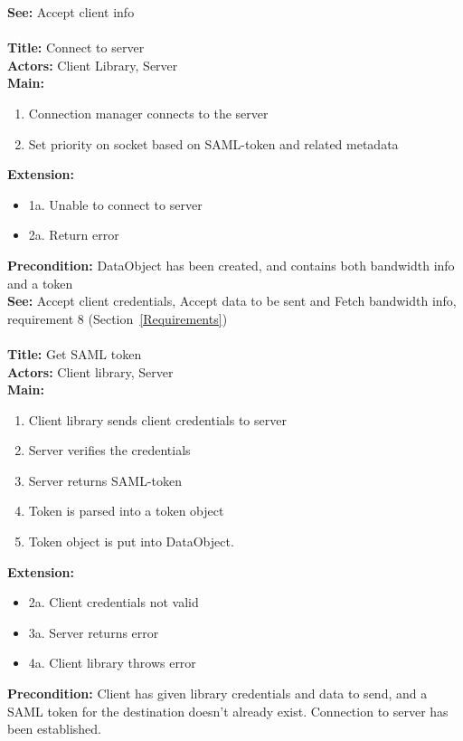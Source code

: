 		\textbf{See:} Accept client info
		\\\\
		\textbf{Title:} Connect to server \\
		\textbf{Actors:} Client Library, Server \\
		\textbf{Main:}
		\begin{enumerate}	
			\item Connection manager connects to the server
			\item Set priority on socket based on SAML-token and related metadata
		\end{enumerate}
		\textbf{Extension:}
		\begin{itemize}
			  \item[] 1a. Unable to connect to server
			  \item[] 2a. Return error
		\end{itemize}
		\textbf{Precondition:} DataObject has been created, and contains both bandwidth info and a token \\
		\textbf{See:} Accept client credentials, Accept data to be sent and Fetch bandwidth info, requirement 8 (Section~\ref{Requirements})
		\\\\
		\textbf{Title:} Get SAML token \\
		\textbf{Actors:} Client library, Server \\
		\textbf{Main:}
		\begin{enumerate}
			\item Client library sends client credentials to server
			\item Server verifies the credentials
			\item Server returns SAML-token
			\item Token is parsed into a token object
			\item Token object is put into DataObject.
		\end{enumerate}
		\textbf{Extension:}
		\begin{itemize}
	        \item[] 2a. Client credentials not valid
			\item[] 3a. Server returns error
			\item[] 4a. Client library throws error
		\end{itemize}
		\textbf{Precondition:} Client has given library credentials and data to send, and a SAML token for the destination doesn't already exist. Connection to server has been established. \\
